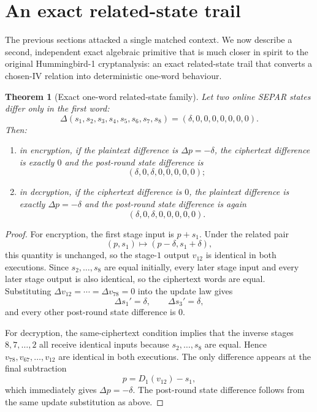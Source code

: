 \documentclass[11pt]{article}
\newtheorem{theorem}{Theorem}
\begin{document}
\section{An exact related-state trail}
The previous sections attacked a single matched context. We now describe a second, independent exact algebraic primitive that is much closer in spirit to the original Hummingbird-1 cryptanalysis: an exact related-state trail that converts a chosen-IV relation into deterministic one-word behaviour.

\begin{theorem}[Exact one-word related-state family]
Let two online SEPAR states differ only in the first word:
\[
\Delta(s_1,s_2,s_3,s_4,s_5,s_6,s_7,s_8)=(\delta,0,0,0,0,0,0,0).
\]
Then:
\begin{enumerate}[label=(\roman*)]
\item in encryption, if the plaintext difference is $\Delta p=-\delta$, the ciphertext difference is exactly $0$ and the post-round state difference is
\[
(\delta,0,\delta,0,0,0,0,0);
\]
\item in decryption, if the ciphertext difference is $0$, the plaintext difference is exactly $\Delta p=-\delta$ and the post-round state difference is again
\[
(\delta,0,\delta,0,0,0,0,0).
\]
\end{enumerate}
\end{theorem}

\begin{proof}
For encryption, the first stage input is $p+s_1$. Under the related pair
\[
(p,s_1)\mapsto (p-\delta,s_1+\delta),
\]
this quantity is unchanged, so the stage-$1$ output $v_{12}$ is identical in both executions. Since $s_2,\dots,s_8$ are equal initially, every later stage input and every later stage output is also identical, so the ciphertext words are equal. Substituting $\Delta v_{12}=\cdots=\Delta v_{78}=0$ into the update law gives
\[
\Delta s_1'=\delta,\qquad
\Delta s_3'=\delta,
\]
and every other post-round state difference is $0$.

For decryption, the same-ciphertext condition implies that the inverse stages $8,7,\dots,2$ all receive identical inputs because $s_2,\dots,s_8$ are equal. Hence $v_{78},v_{67},\dots,v_{12}$ are identical in both executions. The only difference appears at the final subtraction
\[
p=D_1(v_{12})-s_1,
\]
which immediately gives $\Delta p=-\delta$. The post-round state difference follows from the same update substitution as above.
\end{proof}
\end{document}
